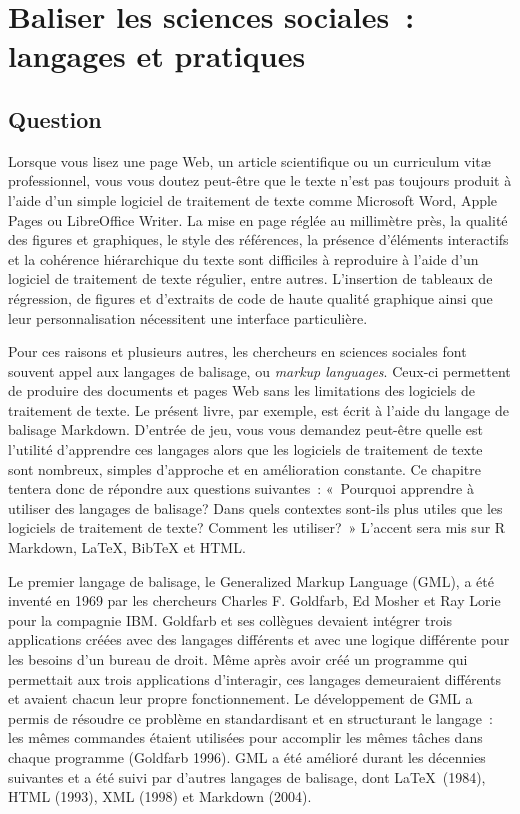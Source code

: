 \documentclass[
  letterpaper,
  DIV=11,
  numbers=noendperiod]{scrreprt}
\begin{document}

\hypertarget{baliser-les-sciences-sociales-langages-et-pratiques}{%
\chapter{Baliser les sciences sociales~: langages et
pratiques}\label{baliser-les-sciences-sociales-langages-et-pratiques}}

\hypertarget{question}{%
\section{Question}\label{question}}

Lorsque vous lisez une page Web, un article scientifique ou un
curriculum vitæ professionnel, vous vous doutez peut-être que le texte
n'est pas toujours produit à l'aide d'un simple logiciel de traitement
de texte comme Microsoft Word, Apple Pages ou LibreOffice Writer. La
mise en page réglée au millimètre près, la qualité des figures et
graphiques, le style des références, la présence d'éléments interactifs
et la cohérence hiérarchique du texte sont difficiles à reproduire à
l'aide d'un logiciel de traitement de texte régulier, entre autres.
L'insertion de tableaux de régression, de figures et d'extraits de code
de haute qualité graphique ainsi que leur personnalisation nécessitent
une interface particulière.

Pour ces raisons et plusieurs autres, les chercheurs en sciences
sociales font souvent appel aux langages de balisage, ou \emph{markup
languages}. Ceux-ci permettent de produire des documents et pages Web
sans les limitations des logiciels de traitement de texte. Le présent
livre, par exemple, est écrit à l'aide du langage de balisage Markdown.
D'entrée de jeu, vous vous demandez peut-être quelle est l'utilité
d'apprendre ces langages alors que les logiciels de traitement de texte
sont nombreux, simples d'approche et en amélioration constante. Ce
chapitre tentera donc de répondre aux questions suivantes~: «~Pourquoi
apprendre à utiliser des langages de balisage? Dans quels contextes
sont-ils plus utiles que les logiciels de traitement de texte? Comment
les utiliser?~» L'accent sera mis sur R Markdown, \LaTeX, BibTeX et
HTML.

Le premier langage de balisage, le Generalized Markup Language (GML), a
été inventé en 1969 par les chercheurs Charles F. Goldfarb, Ed Mosher et
Ray Lorie pour la compagnie IBM. Goldfarb et ses collègues devaient
intégrer trois applications créées avec des langages différents et avec
une logique différente pour les besoins d'un bureau de droit. Même après
avoir créé un programme qui permettait aux trois applications
d'interagir, ces langages demeuraient différents et avaient chacun leur
propre fonctionnement. Le développement de GML a permis de résoudre ce
problème en standardisant et en structurant le langage~: les mêmes
commandes étaient utilisées pour accomplir les mêmes tâches dans chaque
programme (Goldfarb 1996). GML a été amélioré durant les décennies
suivantes et a été suivi par d'autres langages de balisage, dont
\LaTeX~(1984), HTML (1993), XML (1998) et Markdown (2004).
\end{document}
